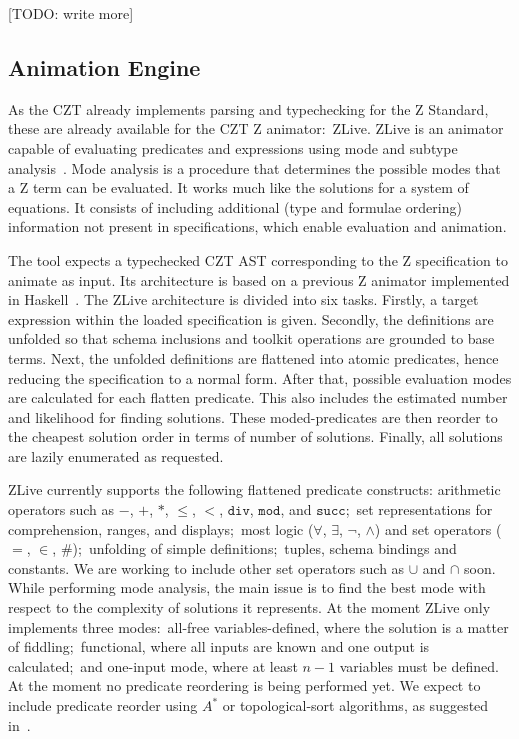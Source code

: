 \documentclass{llncs}
\begin{document}
    [TODO: write more]

\subsection{Animation Engine}

    As the CZT already implements parsing and typechecking for the Z Standard,
    these are already available for the CZT Z animator:~ZLive.
    ZLive is an animator capable of evaluating predicates and expressions using
    mode and subtype analysis~\cite{winikooff98}.
    Mode analysis is a procedure that determines the possible modes that a
    Z term can be evaluated. It works much like the solutions for a system of equations.
    It consists of including additional (type and formulae ordering) information not
    present in specifications, which enable evaluation and animation.

    The tool expects a typechecked CZT AST corresponding to the Z specification to animate
    as input. Its architecture is based on a previous Z animator implemented in Haskell~\cite{utting-jaza}.
    The ZLive architecture is divided into six tasks.
    Firstly, a target expression within the loaded specification is given.
    Secondly, the definitions are unfolded so that schema inclusions and toolkit operations
    are grounded to base terms. Next, the unfolded definitions are flattened into atomic
    predicates, hence reducing the specification to a normal form.
    After that, possible evaluation modes are calculated for each flatten predicate.
    This also includes the estimated number and likelihood for finding solutions.
    These moded-predicates are then reorder to the cheapest solution order in terms of
    number of solutions. Finally, all solutions are lazily enumerated as requested.

    ZLive currently supports the following flattened predicate constructs: arithmetic operators
    such as $-$, $+$, $*$, $\leq$, $<$, $\mathtt{div}$, $\mathtt{mod}$, and $\mathtt{succ}$;~set
    representations for comprehension, ranges, and displays;~most logic ($\forall$,
    $\exists$, $\lnot$, $\land$) and set operators ($=$, $\in$, $\#$);~unfolding of simple
    definitions;~tuples, schema bindings and constants.
    We are working to include other set operators such as $\cup$ and $\cap$ soon.
    While performing mode analysis, the main issue is to find the best mode with respect to
    the complexity of solutions it represents. At the moment ZLive only implements three modes:~all-free
    variables-defined, where the solution is a matter of fiddling;~functional, where all inputs are known
    and one output is calculated;~and one-input mode, where at least $n-1$ variables must be defined.
    At the moment no predicate reordering is being performed yet.
    We expect to include predicate reorder using $A^*$ or topological-sort algorithms,
    as suggested in~\cite{winikooff98}.
\end{document}
